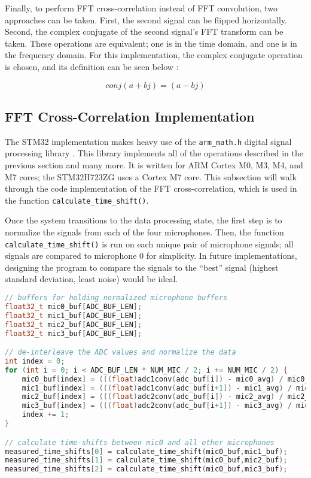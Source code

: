 \documentclass[12pt,a4paper]{report}
\begin{document}
\pagebreak

Finally, to perform FFT cross-correlation instead of FFT convolution, two approaches can be taken. First, the second signal can be flipped horizontally. Second, the complex conjugate of the second signal’s FFT transform can be taken. These operations are equivalent; one is in the time domain, and one is in the frequency domain. For this implementation, the complex conjugate operation is chosen, and its definition can be seen below \cite{dspguide}:

\begin{equation} \label{eq:3eq3}
conj(a + bj) = (a - bj)
\end{equation}

\subsection{FFT Cross-Correlation Implementation} \label{ssec:3s8s2}
The STM32 implementation makes heavy use of the \verb|arm_math.h| digital signal processing library \cite{arm}. This library implements all of the operations described in the previous section and many more. It is written for ARM Cortex M0, M3, M4, and M7 cores; the STM32H723ZG uses a Cortex M7 core. This subsection will walk through the code implementation of the FFT cross-correlation, which is used in the function \verb|calculate_time_shift()|.

Once the system transitions to the data processing state, the first step is to normalize the signals from each of the four microphones. Then, the function \verb|calculate_time_shift()| is run on each unique pair of microphone signals; all signals are compared to microphone 0 for simplicity. In future implementations, designing the program to compare the signals to the “best” signal (highest standard deviation, least noise) would be ideal.

\begin{lstlisting}[language=C++]
// buffers for holding normalized microphone buffers
float32_t mic0_buf[ADC_BUF_LEN];
float32_t mic1_buf[ADC_BUF_LEN];
float32_t mic2_buf[ADC_BUF_LEN];
float32_t mic3_buf[ADC_BUF_LEN];

// de-interleave the ADC values and normalize the data
int index = 0;
for (int i = 0; i < ADC_BUF_LEN * NUM_MIC / 2; i += NUM_MIC / 2) {
	mic0_buf[index] = (((float)adc1conv(adc_buf[i]) - mic0_avg) / mic0_stdev);
	mic1_buf[index] = (((float)adc1conv(adc_buf[i+1]) - mic1_avg) / mic1_stdev);
	mic2_buf[index] = (((float)adc2conv(adc_buf[i]) - mic2_avg) / mic2_stdev);
	mic3_buf[index] = (((float)adc2conv(adc_buf[i+1]) - mic3_avg) / mic3_stdev);
	index += 1;
}

// calculate time-shifts between mic0 and all other microphones
measured_time_shifts[0] = calculate_time_shift(mic0_buf,mic1_buf);
measured_time_shifts[1] = calculate_time_shift(mic0_buf,mic2_buf);
measured_time_shifts[2] = calculate_time_shift(mic0_buf,mic3_buf);
\end{lstlisting}
\end{document}
